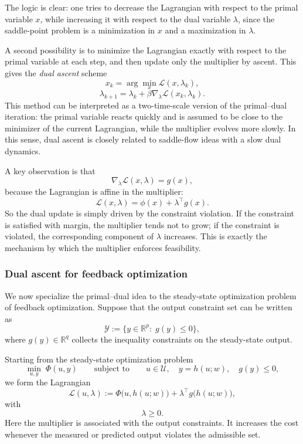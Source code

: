 The logic is clear: one tries to decrease the Lagrangian with respect to the primal variable $x$, while increasing it with respect to the dual variable $\lambda$, since the saddle-point problem is a minimization in $x$ and a maximization in $\lambda$.

A second possibility is to minimize the Lagrangian exactly with respect to the primal variable at each step, and then update only the multiplier by ascent. This gives the \emph{dual ascent} scheme
\[
x_k=\arg\min_x \mathcal L(x,\lambda_k),
\]
\[
\lambda_{k+1}=\lambda_k+\beta \nabla_\lambda \mathcal L(x_k,\lambda_k).
\]
This method can be interpreted as a two-time-scale version of the primal--dual iteration: the primal variable reacts quickly and is assumed to be close to the minimizer of the current Lagrangian, while the multiplier evolves more slowly. In this sense, dual ascent is closely related to saddle-flow ideas with a slow dual dynamics.

A key observation is that
\[
\nabla_\lambda \mathcal L(x,\lambda)=g(x),
\]
because the Lagrangian is affine in the multiplier:
\[
\mathcal L(x,\lambda)=\phi(x)+\lambda^\top g(x).
\]
So the dual update is simply driven by the constraint violation. If the constraint is satisfied with margin, the multiplier tends not to grow; if the constraint is violated, the corresponding component of $\lambda$ increases. This is exactly the mechanism by which the multiplier enforces feasibility.

\subsubsection{Dual ascent for feedback optimization}

We now specialize the primal--dual idea to the steady-state optimization problem of feedback optimization. Suppose that the output constraint set can be written as
\[
\mathcal Y:=\{y\in\mathbb R^p:\; g(y)\le 0\},
\]
where $g(y)\in\mathbb R^q$ collects the inequality constraints on the steady-state output.

Starting from the steady-state optimization problem
\[
\min_{u,y}\; \Phi(u,y)
\qquad
\text{subject to}
\qquad
u\in\mathcal U,\quad y=h(u;w),\quad g(y)\le 0,
\]
we form the Lagrangian
\[
\mathcal L(u,\lambda)
:=
\Phi\bigl(u,h(u;w)\bigr)+\lambda^\top g\bigl(h(u;w)\bigr),
\]
with
\[
\lambda\ge 0.
\]
Here the multiplier is associated with the output constraints. It increases the cost whenever the measured or predicted output violates the admissible set.

